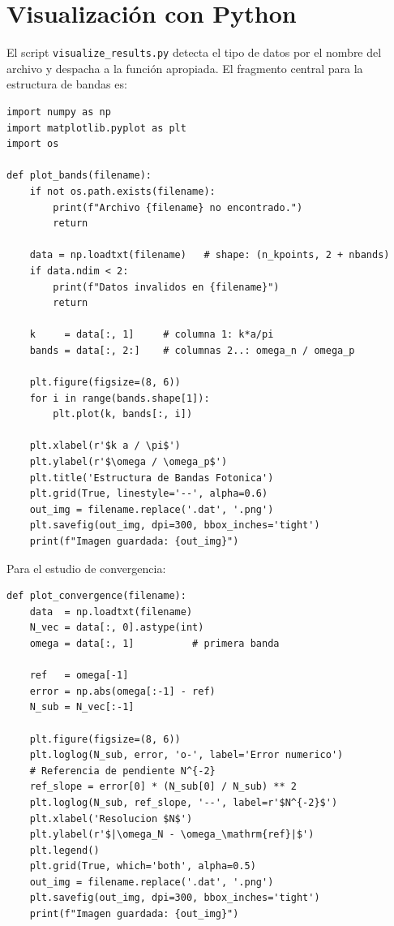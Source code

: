 \documentclass[12pt,a4paper]{article}
\begin{document}
\section{Visualización con Python}

El script \texttt{visualize\_results.py} detecta el tipo de datos por
el nombre del archivo y despacha a la función apropiada.
El fragmento central para la estructura de bandas es:

\begin{lstlisting}[style=python, caption={Función de graficación de bandas en \texttt{visualize\_results.py}}]
import numpy as np
import matplotlib.pyplot as plt
import os

def plot_bands(filename):
    if not os.path.exists(filename):
        print(f"Archivo {filename} no encontrado.")
        return

    data = np.loadtxt(filename)   # shape: (n_kpoints, 2 + nbands)
    if data.ndim < 2:
        print(f"Datos invalidos en {filename}")
        return

    k     = data[:, 1]     # columna 1: k*a/pi
    bands = data[:, 2:]    # columnas 2..: omega_n / omega_p

    plt.figure(figsize=(8, 6))
    for i in range(bands.shape[1]):
        plt.plot(k, bands[:, i])

    plt.xlabel(r'$k a / \pi$')
    plt.ylabel(r'$\omega / \omega_p$')
    plt.title('Estructura de Bandas Fotonica')
    plt.grid(True, linestyle='--', alpha=0.6)
    out_img = filename.replace('.dat', '.png')
    plt.savefig(out_img, dpi=300, bbox_inches='tight')
    print(f"Imagen guardada: {out_img}")
\end{lstlisting}

\noindent
Para el estudio de convergencia:

\begin{lstlisting}[style=python, caption={Función de convergencia en \texttt{visualize\_results.py}}]
def plot_convergence(filename):
    data  = np.loadtxt(filename)
    N_vec = data[:, 0].astype(int)
    omega = data[:, 1]          # primera banda

    ref   = omega[-1]
    error = np.abs(omega[:-1] - ref)
    N_sub = N_vec[:-1]

    plt.figure(figsize=(8, 6))
    plt.loglog(N_sub, error, 'o-', label='Error numerico')
    # Referencia de pendiente N^{-2}
    ref_slope = error[0] * (N_sub[0] / N_sub) ** 2
    plt.loglog(N_sub, ref_slope, '--', label=r'$N^{-2}$')
    plt.xlabel('Resolucion $N$')
    plt.ylabel(r'$|\omega_N - \omega_\mathrm{ref}|$')
    plt.legend()
    plt.grid(True, which='both', alpha=0.5)
    out_img = filename.replace('.dat', '.png')
    plt.savefig(out_img, dpi=300, bbox_inches='tight')
    print(f"Imagen guardada: {out_img}")
\end{lstlisting}
\end{document}
